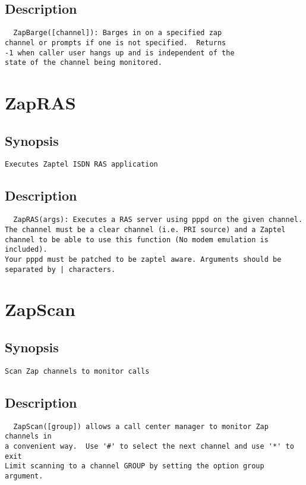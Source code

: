 \subsection{Description}
\begin{verbatim}
  ZapBarge([channel]): Barges in on a specified zap
channel or prompts if one is not specified.  Returns
-1 when caller user hangs up and is independent of the
state of the channel being monitored.
\end{verbatim}


\section{ZapRAS}
\subsection{Synopsis}
\begin{verbatim}
Executes Zaptel ISDN RAS application
\end{verbatim}
\subsection{Description}
\begin{verbatim}
  ZapRAS(args): Executes a RAS server using pppd on the given channel.
The channel must be a clear channel (i.e. PRI source) and a Zaptel
channel to be able to use this function (No modem emulation is included).
Your pppd must be patched to be zaptel aware. Arguments should be
separated by | characters.

\end{verbatim}


\section{ZapScan}
\subsection{Synopsis}
\begin{verbatim}
Scan Zap channels to monitor calls
\end{verbatim}
\subsection{Description}
\begin{verbatim}
  ZapScan([group]) allows a call center manager to monitor Zap channels in
a convenient way.  Use '#' to select the next channel and use '*' to exit
Limit scanning to a channel GROUP by setting the option group argument.

\end{verbatim}


